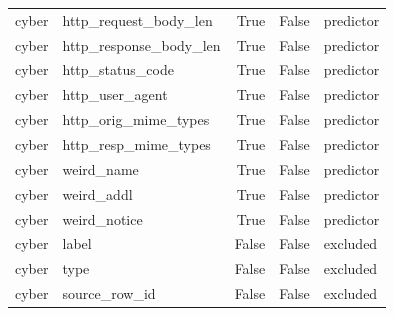 \begin{table}[t]
{\begin{tabular}{llrrl}
cyber & http\_request\_body\_len & True & False & predictor \\
cyber & http\_response\_body\_len & True & False & predictor \\
cyber & http\_status\_code & True & False & predictor \\
cyber & http\_user\_agent & True & False & predictor \\
cyber & http\_orig\_mime\_types & True & False & predictor \\
cyber & http\_resp\_mime\_types & True & False & predictor \\
cyber & weird\_name & True & False & predictor \\
cyber & weird\_addl & True & False & predictor \\
cyber & weird\_notice & True & False & predictor \\
cyber & label & False & False & excluded \\
cyber & type & False & False & excluded \\
cyber & source\_row\_id & False & False & excluded \\
\bottomrule
\end{tabular}
}
\end{table}
